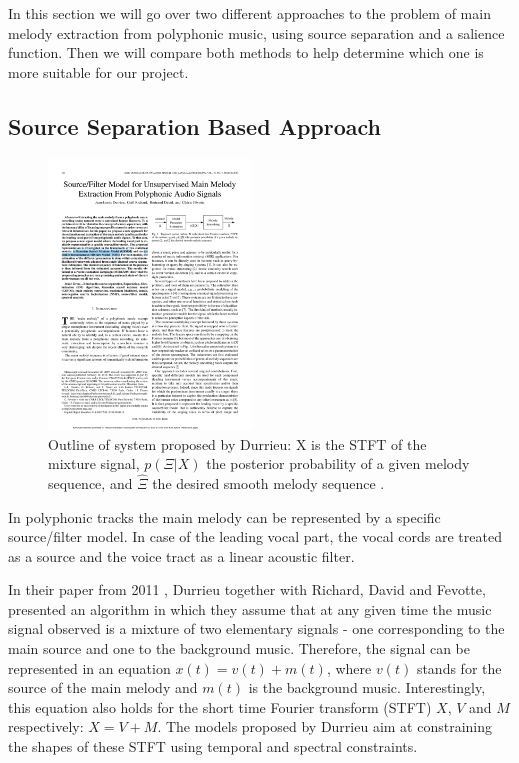 In this section we will go over two different approaches to the problem of main melody extraction from polyphonic music, using source separation and a salience function. Then we will compare both methods to help determine which one is more suitable for our project.

\vspace{10pt}

\subsection{Source Separation Based Approach}


\begin{figure}
\vspace{-30pt}
  \begin{center}
    \includegraphics[width=0.48\textwidth]{Figures/durrieudiagram}
  \end{center}
  \caption{Outline of system proposed by Durrieu: X is the STFT of the mixture signal, $p(\Xi|X)$ the posterior probability of a given melody sequence, and $\hat{\Xi} $ the desired smooth melody sequence \cite{durrieu}.}
  \label{fig:durrieu}
\end{figure}


In polyphonic tracks the main melody can be represented by a specific source/filter model. In case of the leading vocal part, the vocal cords are treated as a source and the voice tract as a linear acoustic filter.

In their paper from 2011 \cite{durrieu}, Durrieu together with Richard, David and Fevotte, presented an algorithm in which they assume that at any given time the music signal observed is a mixture of two elementary signals - one corresponding to the main source and one to the background music. Therefore, the signal can be represented in an equation $x(t) = v(t) + m(t)$, where $v(t)$ stands for the source of the main melody and $m(t)$ is the background music. Interestingly, this equation also holds for the short time Fourier transform (STFT)  $X$, $V$ and $M$ respectively: $X = V + M$. The models proposed by Durrieu aim at constraining the shapes of these STFT using temporal and spectral constraints. 

